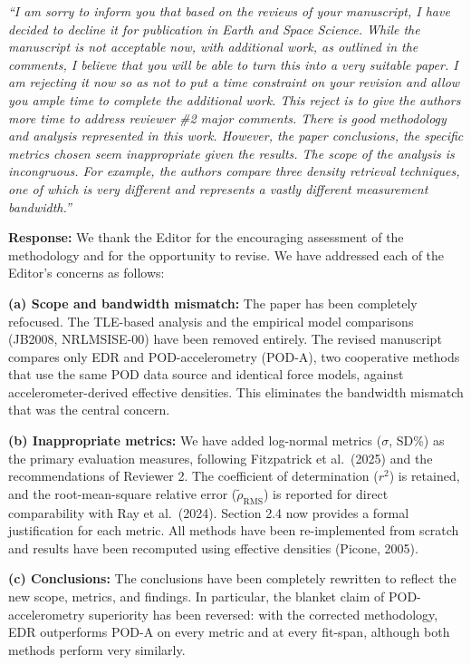 \documentclass[11pt]{article}
\newcommand{\reviewercomment}[1]{%
  \medskip
  \noindent\textit{\color{reviewblue}#1}%
  \medskip
}
\begin{document}
\reviewercomment{%
``I am sorry to inform you that based on the reviews of your manuscript, I have decided to decline it for publication in Earth and Space Science. While the manuscript is not acceptable now, with additional work, as outlined in the comments, I believe that you will be able to turn this into a very suitable paper. I am rejecting it now so as not to put a time constraint on your revision and allow you ample time to complete the additional work. This reject is to give the authors more time to address reviewer \#2 major comments. There is good methodology and analysis represented in this work. However, the paper conclusions, the specific metrics chosen seem inappropriate given the results. The scope of the analysis is incongruous. For example, the authors compare three density retrieval techniques, one of which is very different and represents a vastly different measurement bandwidth.''}

\textbf{Response:}
We thank the Editor for the encouraging assessment of the methodology and for the opportunity to revise. We have addressed each of the Editor's concerns as follows:

\textbf{(a) Scope and bandwidth mismatch:} The paper has been completely refocused. The TLE-based analysis and the empirical model comparisons (JB2008, NRLMSISE-00) have been removed entirely. The revised manuscript compares only EDR and POD-accelerometry (POD-A), two cooperative methods that use the same POD data source and identical force models, against accelerometer-derived effective densities. This eliminates the bandwidth mismatch that was the central concern.

\textbf{(b) Inappropriate metrics:} We have added log-normal metrics ($\sigma$, SD\%) as the primary evaluation measures, following Fitzpatrick et al.\ (2025) and the recommendations of Reviewer 2. The coefficient of determination ($r^2$) is retained, and the root-mean-square relative error ($\tilde{\rho}_\mathrm{RMS}$) is reported for direct comparability with Ray et al.\ (2024). Section 2.4 now provides a formal justification for each metric. All methods have been re-implemented from scratch and results have been recomputed using effective densities (Picone, 2005).

\textbf{(c) Conclusions:} The conclusions have been completely rewritten to reflect the new scope, metrics, and findings. In particular, the blanket claim of POD-accelerometry superiority has been reversed: with the corrected methodology, EDR outperforms POD-A on every metric and at every fit-span, although both methods perform very similarly.
\end{document}
